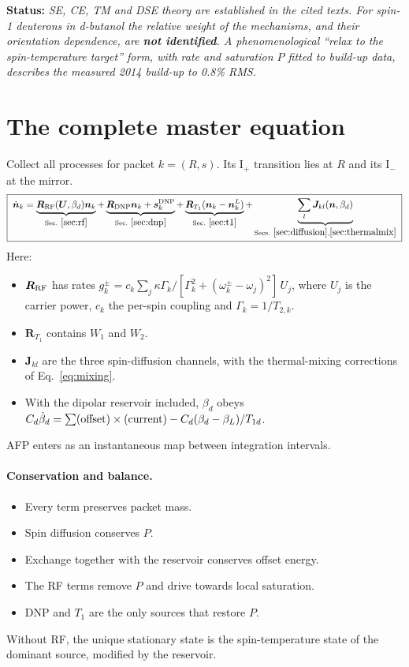 \documentclass[11pt]{article}
\newcommand{\status}[1]{\par\noindent\textbf{\textsf{Status:}} \emph{#1}\par}
\begin{document}
\status{SE, CE, TM and DSE theory are established in the cited texts. For spin-1 deuterons in
d-butanol the relative weight of the mechanisms, and their orientation dependence, are
\textbf{not identified}. A phenomenological ``relax to the spin-temperature target'' form, with
rate and saturation $P$ fitted to build-up data, describes the measured 2014 build-up to 0.8\%
RMS.}

\section{The complete master equation}
\label{sec:master}
Collect all processes for packet $k=(R,s)$. Its I$_+$ transition lies at $R$ and its I$_-$ at
the mirror.
\begin{equation}
\boxed{\;
\dot{\bm n}_k=\underbrace{\bm R_{\rm RF}(\bm U,\beta_d)\bm n_k}_{\rm Sec.~\ref{sec:rf}}
+\underbrace{\bm R_{\rm DNP}\bm n_k+\bm s^{\rm DNP}_k}_{\rm Sec.~\ref{sec:dnp}}
+\underbrace{\bm R_{T_1}(\bm n_k-\bm n^{L}_k)}_{\rm Sec.~\ref{sec:t1}}
+\underbrace{\sum_{l}\bm J_{kl}(\bm n,\beta_d)}_{\rm Secs.~\ref{sec:diffusion},\ref{sec:thermalmix}}
\;}
\label{eq:master}
\end{equation}
Here:
\begin{itemize}
\item $\bm R_{\rm RF}$ has rates
$g^{\pm}_k=c_k\sum_j\kappa\Gamma_k/[\Gamma_k^2+(\omega^\pm_k-\omega_j)^2]\,U_j$, where $U_j$ is
the carrier power, $c_k$ the per-spin coupling and $\Gamma_k=1/T_{2,k}$.
\item $\bm R_{T_1}$ contains $W_1$ and $W_2$.
\item $\bm J_{kl}$ are the three spin-diffusion channels, with the thermal-mixing corrections of
Eq.~\eqref{eq:mixing}.
\item With the dipolar reservoir included, $\beta_d$ obeys
$C_d\dot\beta_d=\sum({\rm offset})\times({\rm current})-C_d(\beta_d-\beta_L)/T_{1d}$.
\end{itemize}
AFP enters as an instantaneous map between integration intervals.

\paragraph{Conservation and balance.}
\begin{itemize}
\item Every term preserves packet mass.
\item Spin diffusion conserves $P$.
\item Exchange together with the reservoir conserves offset energy.
\item The RF terms remove $P$ and drive towards local saturation.
\item DNP and $T_1$ are the only sources that restore $P$.
\end{itemize}
Without RF, the unique stationary state is the spin-temperature state of the dominant source,
modified by the reservoir.
\end{document}
